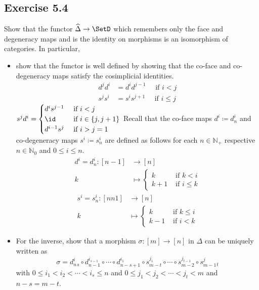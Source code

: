 \subsection{ Exercise 5.4 }

Show that the functor $ \widehat{ \Delta }  \to \SetD $ which remembers only the face and degeneracy maps and is the identity on morphisms is an isomorphism of categories. 
In particular,
 \begin{itemize}
     \item 
     show that the functor is well defined by showing that the co-face and co-degeneracy maps satisfy the cosimplicial identities.
     \begin{align*}
         d^jd^i &= d^i d^{j-1} \quad \text{ if } i < j
         \\
         s^j s^i &= s^i s^{j+1} \quad \text{ if } i \leq j
     \end{align*}
     \qquad
     $
     s^j d^i=
     \begin{cases}
         d^i s^{j-1} &\text{ if } i < j 
         \\
         \id &\text{ if } i \in \{ j , j + 1 \}
         \\
         d^{i-1} s^j &\text{ if } i > j = 1
     \end{cases}
     $
     Recall that the co-face maps $ d^i \coloneqq d_n^i $ and co-degeneracy maps $ s^i \coloneqq s_n^i $ are defined as follows for each $ n \in \mathbb{ N }_+ $ respective $ n \in \mathbb{ N }_0 $ and $ 0 \leq i \leq n $.  
     \begin{align*}
         d^i = d_n^i \colon [ n - 1 ] &\to [ n ]
         \\
         k &\mapsto 
         \begin{cases}
             k & \text{ if } k < i 
             \\
             k+1 & \text{ if } i \leq k 
         \end{cases}
     \end{align*}
     \quad
     \begin{align*}
         s^i = s_n^i \colon [ n n 1 ] &\to [ n ]
         \\
         k &\mapsto 
         \begin{cases}
             k & \text{ if } k \leq i 
             \\
             k-1 & \text{ if } i < k 
         \end{cases}
     \end{align*}

     \item  
     For the inverse, show that a morphism $ \sigma \colon [m] \to [n] $ in $ \Delta $ can be uniquely written as
    \[
        \sigma 
        =
        d_n^i_s
        \circ d_{ n - 1 }^{i_{s-1}} 
        \circ 
        \dotsm 
        \circ
        d_{ n - s + 1 }^{i_1}
        \circ
        s_{ m - t }^{j_1}
        \circ 
        \dotsm
        \circ
        s_{ m - 2 }^{ j_{t-1}}
        \circ 
        s_{ m - 1 }^j_t
    \]
    with $ 0 \leq i_1 < i_2 < \dotsm < i_s \leq n $ and $ 0 \leq j_1 < j_2 < \dotsm < j_t < m $ and $ n-s = m-t $.
\end{itemize}

